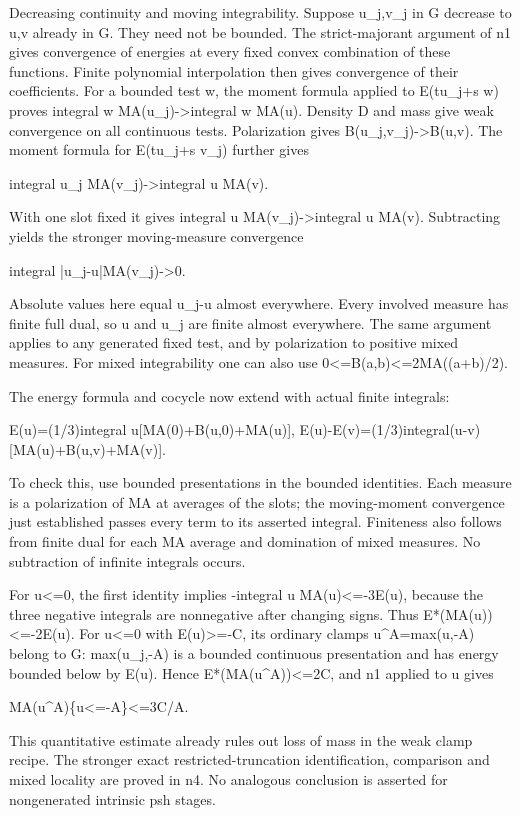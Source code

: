 \documentclass[11pt]{article}
\begin{document}
Decreasing continuity and moving integrability. Suppose u\_j,v\_j in G decrease to u,v already in G. They need not be bounded. The strict-majorant argument of n1 gives convergence of energies at every fixed convex combination of these functions. Finite polynomial interpolation then gives convergence of their coefficients. For a bounded test w, the moment formula applied to E(tu\_j+s w) proves integral w MA(u\_j)->integral w MA(u). Density D and mass give weak convergence on all continuous tests. Polarization gives B(u\_j,v\_j)->B(u,v). The moment formula for E(tu\_j+s v\_j) further gives

integral u\_j MA(v\_j)->integral u MA(v).

With one slot fixed it gives integral u MA(v\_j)->integral u MA(v). Subtracting yields the stronger moving-measure convergence

integral |u\_j-u|MA(v\_j)->0.

Absolute values here equal u\_j-u almost everywhere. Every involved measure has finite full dual, so u and u\_j are finite almost everywhere. The same argument applies to any generated fixed test, and by polarization to positive mixed measures. For mixed integrability one can also use 0<=B(a,b)<=2MA((a+b)/2).

The energy formula and cocycle now extend with actual finite integrals:

E(u)=(1/3)integral u[MA(0)+B(u,0)+MA(u)],
E(u)-E(v)=(1/3)integral(u-v)[MA(u)+B(u,v)+MA(v)].

To check this, use bounded presentations in the bounded identities. Each measure is a polarization of MA at averages of the slots; the moving-moment convergence just established passes every term to its asserted integral. Finiteness also follows from finite dual for each MA average and domination of mixed measures. No subtraction of infinite integrals occurs.

For u<=0, the first identity implies -integral u MA(u)<=-3E(u), because the three negative integrals are nonnegative after changing signs. Thus E*(MA(u))<=-2E(u). For u<=0 with E(u)>=-C, its ordinary clamps u\textasciicircum{}A=max(u,-A) belong to G: max(u\_j,-A) is a bounded continuous presentation and has energy bounded below by E(u). Hence E*(MA(u\textasciicircum{}A))<=2C, and n1 applied to u gives

MA(u\textasciicircum{}A)\{u<=-A\}<=3C/A.

This quantitative estimate already rules out loss of mass in the weak clamp recipe. The stronger exact restricted-truncation identification, comparison and mixed locality are proved in n4. No analogous conclusion is asserted for nongenerated intrinsic psh stages.
\end{document}
